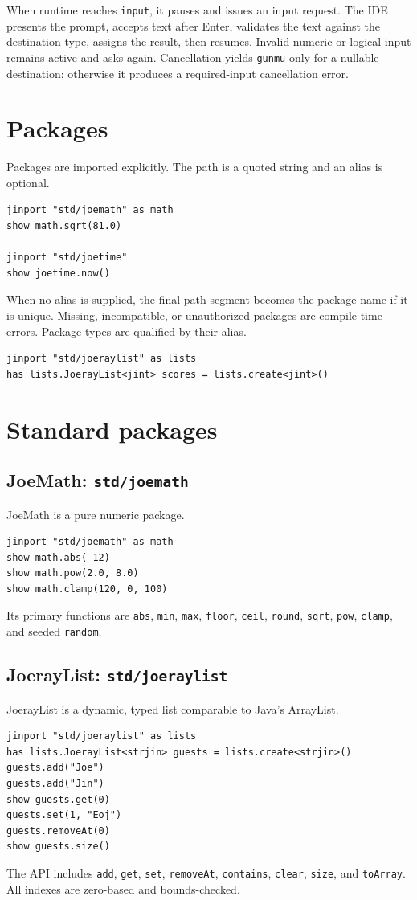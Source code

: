 \documentclass[11pt]{article}
\newcommand{\keyword}[1]{\texttt{#1}}
\begin{document}
When runtime reaches \keyword{input}, it pauses and issues an input request. The IDE presents the prompt, accepts text after Enter, validates the text against the destination type, assigns the result, then resumes. Invalid numeric or logical input remains active and asks again. Cancellation yields \keyword{gunmu} only for a nullable destination; otherwise it produces a required-input cancellation error.

\section{Packages}
Packages are imported explicitly. The path is a quoted string and an alias is optional.
\begin{lstlisting}
jinport "std/joemath" as math
show math.sqrt(81.0)

jinport "std/joetime"
show joetime.now()
\end{lstlisting}

When no alias is supplied, the final path segment becomes the package name if it is unique. Missing, incompatible, or unauthorized packages are compile-time errors. Package types are qualified by their alias.

\begin{lstlisting}
jinport "std/joeraylist" as lists
has lists.JoerayList<jint> scores = lists.create<jint>()
\end{lstlisting}

\section{Standard packages}
\subsection{JoeMath: \keyword{std/joemath}}
JoeMath is a pure numeric package.
\begin{lstlisting}
jinport "std/joemath" as math
show math.abs(-12)
show math.pow(2.0, 8.0)
show math.clamp(120, 0, 100)
\end{lstlisting}
Its primary functions are \keyword{abs}, \keyword{min}, \keyword{max}, \keyword{floor}, \keyword{ceil}, \keyword{round}, \keyword{sqrt}, \keyword{pow}, \keyword{clamp}, and seeded \keyword{random}.

\subsection{JoerayList: \keyword{std/joeraylist}}
JoerayList is a dynamic, typed list comparable to Java's ArrayList.
\begin{lstlisting}
jinport "std/joeraylist" as lists
has lists.JoerayList<strjin> guests = lists.create<strjin>()
guests.add("Joe")
guests.add("Jin")
show guests.get(0)
guests.set(1, "Eoj")
guests.removeAt(0)
show guests.size()
\end{lstlisting}
The API includes \keyword{add}, \keyword{get}, \keyword{set}, \keyword{removeAt}, \keyword{contains}, \keyword{clear}, \keyword{size}, and \keyword{toArray}. All indexes are zero-based and bounds-checked.
\end{document}
